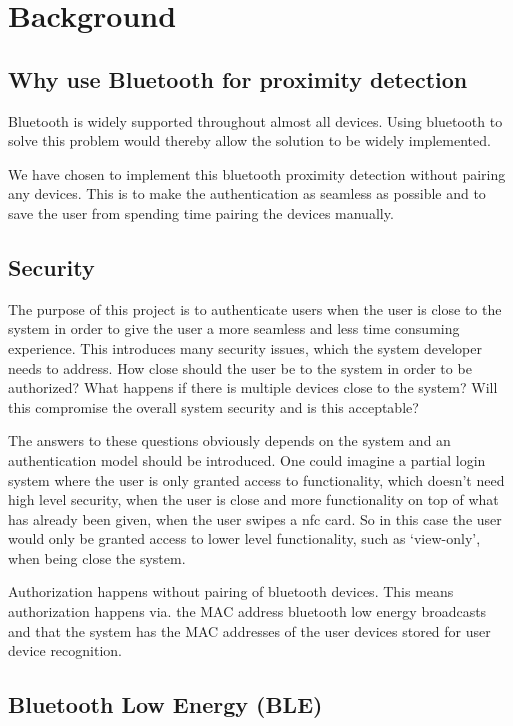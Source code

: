 \section{Background}

\subsection{Why use Bluetooth for proximity detection}

Bluetooth is widely supported throughout almost all devices.
Using bluetooth to solve this problem would thereby allow the solution to be widely implemented.

We have chosen to implement this bluetooth proximity detection without pairing any devices.
This is to make the authentication as seamless as possible and to save the user from spending time pairing the devices manually.

\subsection{Security}

The purpose of this project is to authenticate users when the user is close to the system in order to give the user a more seamless and less time consuming experience.
This introduces many security issues, which the system developer needs to address.
How close should the user be to the system in order to be authorized? What happens if there is multiple devices close to the system? Will this compromise the overall system security and is this acceptable?

The answers to these questions obviously depends on the system and an authentication model should be introduced.
One could imagine a partial login system where the user is only granted access to functionality, which doesn’t need high level security, when the user is close and more functionality on top of what has already been given, when the user swipes a nfc card.
So in this case the user would only be granted access to lower level functionality, such as ‘view-only’, when being close the system.

Authorization happens without pairing of bluetooth devices.
This means authorization happens via.
the MAC address bluetooth low energy broadcasts and that the system has the MAC addresses of the user devices stored for user device recognition.

\subsection{Bluetooth Low Energy (BLE)}

